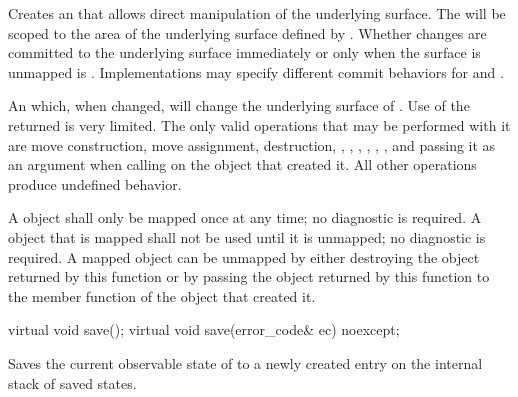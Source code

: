 \begin{itemdecl}
\end{itemdecl}
\begin{itemdescr}
	\pnum
	\effects
	Creates an  that allows direct manipulation of the underlying surface. The  will be scoped to the area of the underlying surface defined by . Whether changes are committed to the underlying surface immediately or only when the surface is unmapped is . Implementations may specify different commit behaviors for  and .
	
	\pnum
	\returns
	An  which, when changed, will change the underlying surface of . 
	\enternote
	Use of the returned  is very limited. The only valid operations that may be performed with it are move construction, move assignment, destruction, , , , , , , and passing it as an argument when calling  on the  object that created it. All other operations produce undefined behavior.
	\exitnote
	
	\pnum
	\remarks
	A  object shall only be mapped once at any time; no diagnostic is required. A  object that is mapped shall not be used until it is unmapped; no diagnostic is required. A mapped  object can be unmapped by either destroying the  object returned by this function or by passing the  object returned by this function to the  member function of the  object that created it. 
\end{itemdescr}

\begin{itemdecl}
virtual void save();
virtual void save(error_code& ec) noexcept;
\end{itemdecl}
\begin{itemdescr}
	\pnum
	\effects
	Saves the current observable state of  to a newly created entry on the internal stack of saved states.
\end{itemdescr}

